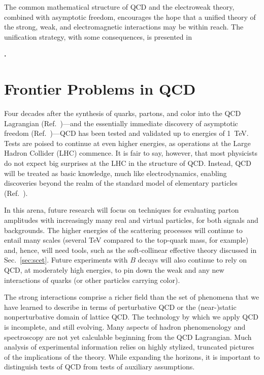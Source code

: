 \documentclass[11pt,prb,groupedaddress,nofootinbib,showpacs,floatfix]{revtex4-1}
\newcommand{\citentry}[1]{%
\par\addvspace{0.5em plus 0.05em minus 0.05em}%
\sloppy
\noindent\textbf{\onlinecite{#1}.}~\bibentry{#1}%
\par\addvspace{0.5em plus 0.05em minus 0.05em}
}
\begin{document}
The common mathematical structure of QCD and the electroweak theory,
combined with asymptotic freedom, encourages the hope that a unified
theory of the strong, weak, and electromagnetic interactions may be
within reach.
The unification strategy, with some consequences, is presented in
\citentry{Georgi:1981yp}

\section{Frontier Problems in QCD}
\label{sec:outlook}

Four decades after the synthesis of quarks, partons, and color into the 
QCD Lagrangian (Ref.~)---and the essentially 
immediate discovery of asymptotic 
freedom (Ref.~)---QCD 
has been tested and validated up to energies of 1~TeV.
Tests are poised to continue at even higher energies, as operations at 
the Large Hadron Collider (LHC) commence.
It is fair to say, however, that most physicists do not expect big 
surprises at the LHC in the structure of QCD.
Instead, QCD will be treated as basic knowledge, much like 
electrodynamics, enabling discoveries beyond the realm of the standard  
model of elementary particles (Ref.~).

In this arena, future research will focus on techniques for evaluating 
parton amplitudes with increasingly many real and virtual particles,
for both signals and backgrounds.
The higher energies of the scattering processes will continue to entail 
many scales (several TeV compared to the top-quark mass, for example) 
and, hence, will need tools, such as the soft-collinear effective theory
discussed in Sec.~\ref{sec:scet}.
Future experiments with $B$ decays will also continue to rely on QCD, 
at moderately high energies,  to pin down the weak and any new 
interactions of quarks (or other particles carrying color).

The strong interactions comprise a richer field than the set of 
phenomena that we have learned to describe in terms of perturbative QCD 
or the (near-)static nonperturbative domain of lattice QCD.
The technology by which we apply QCD is incomplete, and still evolving.
Many aspects of hadron phenomenology and spectroscopy are not yet 
calculable beginning from the QCD Lagrangian.
Much analysis of experimental information relies on highly stylized, 
truncated pictures of the implications of the theory.
While expanding the horizons, it is important to distinguish tests of 
QCD from tests of auxiliary assumptions.
\end{document}
